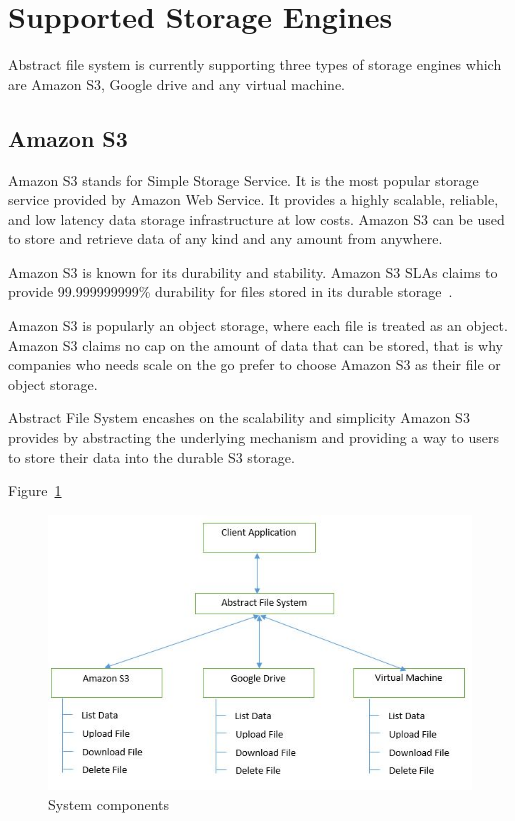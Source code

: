 \section{Supported Storage Engines}
Abstract file system is currently supporting three types of storage engines
which are Amazon S3, Google drive and any virtual machine.

\subsection{Amazon S3}

Amazon S3 stands for Simple Storage Service. It is the most popular storage
service provided by Amazon Web Service. It provides a highly scalable,
reliable, and low latency data storage infrastructure at low costs. Amazon S3
can be used to store and retrieve data of any kind and any amount from 
anywhere.


Amazon S3 is known for its durability and stability. Amazon S3 SLAs claims to
provide 99.999999999\% durability for files stored in its durable 
storage~\cite{hid-sp18-420-amazon-S3}.


Amazon S3 is popularly an object storage, where each file is treated as an
object. Amazon S3 claims no cap on the amount of data that can be stored, that
is why companies who needs scale on the go prefer to choose Amazon S3 as their
file or object storage.


Abstract File System encashes on the scalability and simplicity Amazon S3
provides by abstracting the underlying mechanism and providing a way to users
to store their data into the durable S3 storage.

Figure~\ref{fig:architecture}

\begin{figure}[!ht]
        \centering\includegraphics[width=\columnwidth]
        {image/architecture.JPG}
        \caption{System components}\label{fig:architecture}
\end{figure}


